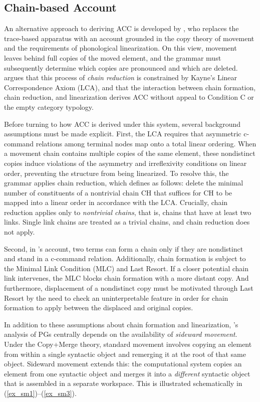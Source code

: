 \documentclass[12pt]{article}
\begin{document}
\subsection{Chain-based Account}

An alternative approach to deriving ACC is developed by \cite{nunes2004}, who replaces the trace-based apparatus with an account grounded in the copy theory of movement and the requirements of phonological linearization. On this view, movement leaves behind full copies of the moved element, and the grammar must subsequently determine which copies are pronounced and which are deleted. \cite{nunes2004} argues that this process of \textit{chain reduction} is constrained by Kayne's \citeyearpar{kayne1994} Linear Correspondence Axiom (LCA), and that the interaction between chain formation, chain reduction, and linearization derives ACC without appeal to Condition C or the empty category typology.

Before turning to how ACC is derived under this system, several background assumptions must be made explicit. First, the LCA requires that asymmetric c-command relations among terminal nodes map onto a total linear ordering. When a movement chain contains multiple copies of the same element, these nondistinct copies induce violations of the asymmetry and irreflexivity conditions on linear order, preventing the structure from being linearized. To resolve this, the grammar applies chain reduction, which \cite{nunes2004} defines as follows: delete the minimal number of constituents of a nontrivial chain CH that suffices for CH to be mapped into a linear order in accordance with the LCA. Crucially, chain reduction applies only to \textit{nontrivial chains}, that is, chains that have at least two links. Single link chains are treated as a trivial chains, and chain reduction does not apply.

Second, in \cite{nunes2004}'s account, two terms can form a chain only if they are nondistinct and stand in a c-command relation. Additionally, chain formation is subject to the Minimal Link Condition (MLC) and Last Resort. If a closer potential chain link intervenes, the MLC blocks chain formation with a more distant copy. And furthermore, displacement of a nondistinct copy must be motivated through Last Resort by the need to check an uninterpretable feature in order for chain formation to apply between the displaced and original copies.  

In addition to these assumptions about chain formation and linearization, \citeauthor{nunes2004}'s analysis of PGs centrally depends on the availability of \textit{sideward movement}. Under the Copy+Merge theory, standard movement involves copying an element from within a single syntactic object and remerging it at the root of that same object. Sideward movement extends this: the computational system copies an element from one syntactic object and merges it into a \textit{different} syntactic object that is assembled in a separate workspace. This is illustrated schematically in (\ref{ex_sm1})--(\ref{ex_sm3}).
\end{document}
